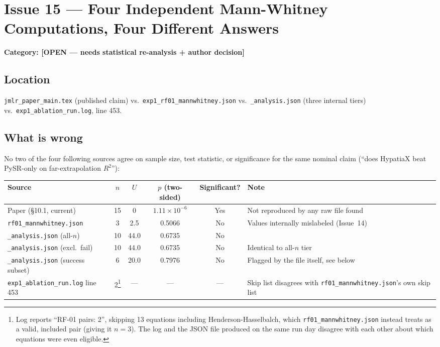 \documentclass[11pt]{article}
\begin{document}
\section*{Issue 15 --- Four Independent Mann-Whitney Computations, Four Different Answers}
\textbf{Category: [OPEN --- needs statistical re-analysis + author decision]}

\subsection*{Location}
\texttt{jmlr\_paper\_main.tex} (published claim) vs.\
\texttt{exp1\_rf01\_mannwhitney.json} vs.\
\texttt{\_analysis.json} (three internal tiers) vs.\
\texttt{exp1\_ablation\_run.log}, line 453.

\subsection*{What is wrong}
No two of the four following sources agree on sample size, test
statistic, or significance for the same nominal claim (``does HypatiaX
beat PySR-only on far-extrapolation $R^2$''):

\begin{center}
\small
\begin{tabular}{lccccl}
\toprule
\textbf{Source} & \textbf{$n$} & \textbf{$U$} & \textbf{$p$ (two-sided)} & \textbf{Significant?} & \textbf{Note} \\
\midrule
Paper (\S10.1, current)         & 15 & 0     & $1.11\times10^{-6}$ & Yes & Not reproduced by any raw file found \\
\texttt{rf01\_mannwhitney.json} & 3  & 2.5   & 0.5066               & No  & Values internally mislabeled (Issue~14) \\
\texttt{\_analysis.json} (all-$n$)     & 10 & 44.0 & 0.6735         & No  & \\
\texttt{\_analysis.json} (excl.\ fail) & 10 & 44.0 & 0.6735         & No  & Identical to all-$n$ tier \\
\texttt{\_analysis.json} (success subset) & 6 & 20.0 & 0.7976       & No  & Flagged by the file itself, see below \\
\texttt{exp1\_ablation\_run.log} line 453 & 2\footnote{Log reports ``RF-01 pairs: 2'', skipping 13 equations including Henderson-Hasselbalch, which \texttt{rf01\_mannwhitney.json} instead treats as a valid, included pair (giving it $n=3$). The log and the JSON file produced on the same run day disagree with each other about which equations were even eligible.} & --- & --- & --- & Skip list disagrees with \texttt{rf01\_mannwhitney.json}'s own skip list \\
\bottomrule
\end{tabular}
\end{center}
\end{document}
